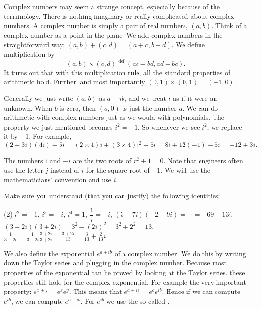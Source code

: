 \medskip

Complex numbers may seem a strange concept, especially because of the
terminology.  There is nothing imaginary or really complicated about complex
numbers.
A complex number is simply a pair of real numbers, $(a,b)$.  
Think of a complex number as a point in the plane.  We add complex numbers
in the straightforward way: $(a,b)+(c,d)=(a+c,b+d)$.  We define
multiplication by
\begin{equation*}
(a,b) \times (c,d) \overset{\text{def}}{=} (ac-bd,ad+bc) .
\end{equation*}
It turns out that with this multiplication rule, all the standard properties
of arithmetic hold.  Further, and most importantly $(0,1) \times (0,1) =
(-1,0)$.

Generally we just write $(a,b)$ as $a+ib$, and we treat $i$ as if it were an
unknown.  When $b$ is zero, then $(a,0)$ is just the number $a$.
We can do arithmetic with complex numbers just as we would
with polynomials.
The property we just mentioned becomes $i^2 = -1$.
So whenever we see $i^2$, we replace it by $-1$.
For example,
\begin{equation*}
(2+3i)(4i) - 5i = 
(2\times 4)i + (3 \times 4) i^2 - 5i
=
8i + 12 (-1) - 5i
=
-12 + 3i .
\end{equation*}

The numbers
$i$ and $-i$ are the two roots of $r^2 + 1 = 0$.
Note that engineers often use the letter $j$ instead of $i$ for the square
root of $-1$.  We will use the mathematicians' convention and use $i$.

\begin{exercise}
Make sure you understand (that you can justify)
the following identities:
\begin{tasks}(2)
\task $i^2 = -1$, $i^3 = -i$, $i^4 = 1$,
\task $\dfrac{1}{i} = -i$,
\task $(3-7i)(-2-9i) = \cdots = -69-13i$,
\task $(3-2i)(3+2i) = 3^2 - {(2i)}^2 = 3^2 + 2^2 = 13$,
\task $\frac{1}{3-2i} = \frac{1}{3-2i} \frac{3+2i}{3+2i} = \frac{3+2i}{13}
= \frac{3}{13}+\frac{2}{13}i$.
\end{tasks}
\end{exercise}

We also define the exponential $e^{a+ib}$ of a complex number.  We do
this by writing down the Taylor series and plugging in the complex
number.  Because most properties of the exponential can be proved by looking
at the Taylor series, these
properties still hold for the complex
exponential.  For example the very important property: $e^{x+y} = e^x e^y$.  This means that
$e^{a+ib} = e^a e^{ib}$.  Hence if we can compute $e^{ib}$, we can
compute $e^{a+ib}$.  For $e^{ib}$ we use the so-called
\emph{}.

